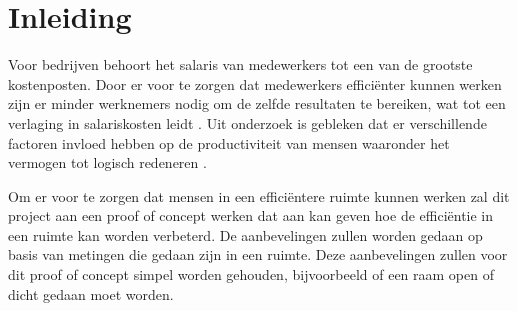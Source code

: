 \section{Inleiding} \label{sec:introduction}
Voor bedrijven behoort het salaris van medewerkers tot een van de grootste kostenposten. Door er voor te zorgen dat medewerkers efficiënter kunnen werken zijn er minder werknemers nodig om de zelfde resultaten te bereiken, wat tot een verlaging in salariskosten leidt \cite{al2016occupant}. Uit onderzoek is gebleken dat er verschillende factoren invloed hebben op de productiviteit van mensen waaronder het vermogen tot logisch redeneren \cite{wyon2006room}.

Om er voor te zorgen dat mensen in een efficiëntere ruimte kunnen werken zal dit project aan een proof of concept werken dat aan kan geven hoe de efficiëntie in een ruimte kan worden verbeterd. De aanbevelingen zullen worden gedaan op basis van metingen die gedaan zijn in een ruimte. Deze aanbevelingen zullen voor dit proof of concept simpel worden gehouden, bijvoorbeeld of een raam open of dicht gedaan moet worden.

